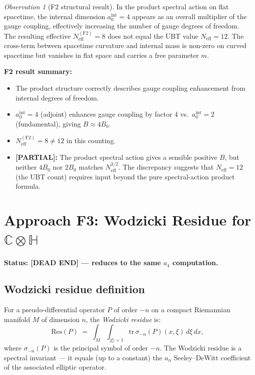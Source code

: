 \documentclass[11pt,a4paper]{article}
\theoremstyle{definition}
\theoremstyle{remark}
\newtheorem{observation}{Observation}
\begin{document}
\begin{observation}[F2 structural result]
  \label{obs:F2}
  In the product spectral action on flat spacetime, the internal dimension
  $a_0^{\mathrm{int}} = 4$ appears as an overall multiplier of the gauge
  coupling, effectively increasing the number of gauge degrees of freedom.
  The resulting effective $N_{\mathrm{eff}}^{(\mathrm{F2})} = 8$ does not
  equal the UBT value $N_{\mathrm{eff}} = 12$.
  The cross-term between spacetime curvature and internal mass is non-zero
  on curved spacetime but vanishes in flat space and carries a free parameter $m$.
\end{observation}

\textbf{F2 result summary:}
\begin{itemize}
  \item The product structure correctly describes gauge coupling enhancement
    from internal degrees of freedom.
  \item $a_0^{\mathrm{int}} = 4$ (adjoint) enhances gauge coupling by factor 4
    vs.\ $a_0^{\mathrm{int}} = 2$ (fundamental), giving $B \approx 4B_0$.
  \item $N_{\mathrm{eff}}^{(\mathrm{F2})} = 8 \neq 12$ in this counting.
  \item \textbf{[PARTIAL]:} The product spectral action gives a sensible positive
    $B$, but neither $4B_0$ nor $2B_0$ matches $N_{\mathrm{eff}}^{3/2}$.
    The discrepancy suggests that $N_{\mathrm{eff}} = 12$ (the UBT count)
    requires input beyond the pure spectral-action product formula.
\end{itemize}

\section{Approach F3: Wodzicki Residue for $\mathbb{C}\otimes\mathbb{H}$}
\label{sec:F3}

\textbf{Status: [DEAD END] — reduces to the same $a_4$ computation.}

\subsection{Wodzicki residue definition}

For a pseudo-differential operator $P$ of order $-n$ on a compact Riemannian
manifold $M$ of dimension $n$, the \emph{Wodzicki residue} is:
\begin{equation}
  \mathrm{Res}(P)
  \;=\; \int_M \int_{|ξ|=1} \mathrm{tr}\,\sigma_{-n}(P)(x,\xi)\,d\xi\,dx,
  \label{eq:Wodzicki}
\end{equation}
where $\sigma_{-n}(P)$ is the principal symbol of order $-n$.
The Wodzicki residue is a spectral invariant — it equals (up to a constant)
the $a_{n}$ Seeley--DeWitt coefficient of the associated elliptic operator.
\end{document}
